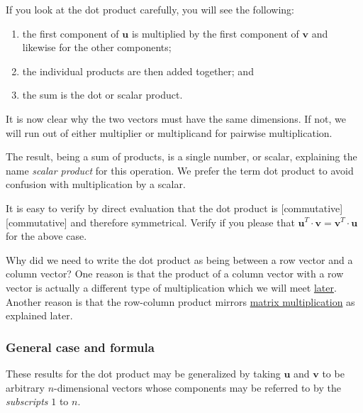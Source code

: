 \documentclass[
  a4paper,
]{article}
\begin{document}
If you look at the dot product carefully, you will see the following:

\begin{enumerate}
\item
  the first component of \(\mathbf{u}\) is multiplied by the first
  component of \(\mathbf{v}\) and likewise for the other components;
\item
  the individual products are then added together; and
\item
  the sum is the dot or scalar product.
\end{enumerate}

It is now clear why the two vectors must have the same dimensions. If
not, we will run out of either multiplier or multiplicand for pairwise
multiplication.

The result, being a sum of products, is a single number, or scalar,
explaining the name \emph{scalar product} for this operation. We prefer
the term dot product to avoid confusion with multiplication by a scalar.

It is easy to verify by direct evaluation that the dot product is
{[}commutative{]}{[}commutative{]} and therefore symmetrical. Verify if
you please that
\(\mathbf{u}^{T}\cdot\mathbf{v} = \mathbf{v}^{T}\cdot\mathbf{u}\) for
the above case.

Why did we need to write the dot product as being between a row vector
and a column vector? One reason is that the product of a column vector
with a row vector is actually a different type of multiplication which
we will meet
\protect\hyperlink{outer-product-of-two-vectorscircledtimes}{later}.
Another reason is that the row-column product mirrors
\protect\hyperlink{example-of-matrix-multiplication}{matrix
multiplication} as explained later.

\hypertarget{general-case-and-formula}{%
\subsubsection{General case and
formula}\label{general-case-and-formula}}

These results for the dot product may be generalized by taking
\(\mathbf{u}\) and \(\mathbf{v}\) to be arbitrary \(n\)-dimensional
vectors whose components may be referred to by the \emph{subscripts}
\(1\) to \(n\).
\end{document}
